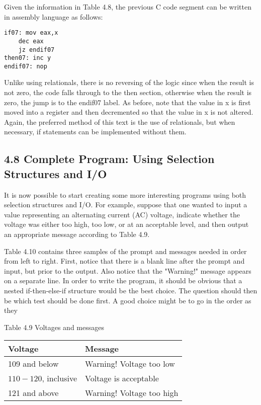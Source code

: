 \documentclass[10pt]{article}
\begin{document}
Given the information in Table 4.8, the previous C code segment can be written in assembly language as follows:

\begin{verbatim}
if07: mov eax,x
    dec eax
    jz endif07
then07: inc y
endif07: nop
\end{verbatim}

Unlike using relationals, there is no reversing of the logic since when the result is not zero, the code falls through to the then section, otherwise when the result is zero, the jump is to the endif07 label. As before, note that the value in x is first moved into a register and then decremented so that the value in x is not altered. Again, the preferred method of this text is the use of relationals, but when necessary, if statements can be implemented without them.

\subsection*{4.8 Complete Program: Using Selection Structures and I/O}
It is now possible to start creating some more interesting programs using both selection structures and I/O. For example, suppose that one wanted to input a value representing an alternating current (AC) voltage, indicate whether the voltage was either too high, too low, or at an acceptable level, and then output an appropriate message according to Table 4.9.

Table 4.10 contains three samples of the prompt and messages needed in order from left to right. First, notice that there is a blank line after the prompt and input, but prior to the output. Also notice that the "Warning!" message appears on a separate line. In order to write the program, it should be obvious that a nested if-then-else-if structure would be the best choice. The question should then be which test should be done first. A good choice might be to go in the order as they

Table 4.9 Voltages and messages

\begin{center}
\begin{tabular}{|l|l|}
\hline
Voltage & Message \\
\hline
109 and below & Warning! Voltage too low \\
\hline
$110-120$, inclusive & Voltage is acceptable \\
\hline
121 and above & Warning! Voltage too high \\
\hline
\end{tabular}
\end{center}
\end{document}

